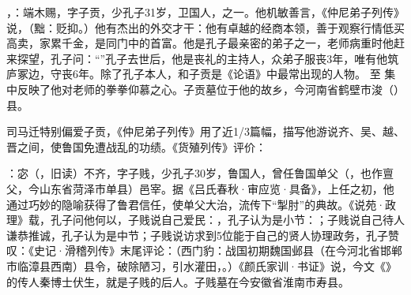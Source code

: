 ，：端木赐，字子贡，少孔子31岁，卫国人，之一。他机敏善言，《仲尼弟子列传》说，（黜：贬抑。）他有杰出的外交才干：他有卓越的经商本领，善于观察行情低买高卖，家累千金，是同门中的首富。他是孔子最亲密的弟子之一，老师病重时他赶来探望，孔子问：“”孔子去世后，他是丧礼的主持人，众弟子服丧3年，唯有他筑庐冢边，守丧6年。除了孔子本人，和子贡是《论语》中最常出现的人物。 至  集中反映了他对老师的拳拳仰慕之心。子贡墓位于他的故乡，今河南省鹤壁市浚（）县。

司马迁特别偏爱子贡，《仲尼弟子列传》用了近1/3篇幅，描写他游说齐、吴、越、晋之间，使鲁国免遭战乱的功绩。《货殖列传》评价：

：宓（，旧读）不齐，字子贱，少孔子30岁，鲁国人，曾任鲁国单父（，也作亶父，今山东省菏泽市单县）邑宰。据《吕氏春秋·审应览·具备》，上任之初，他通过巧妙的隐喻获得了鲁君信任，使单父大治，流传下“掣肘”的典故。《说苑·政理》载，孔子问他何以，子贱说自己爱民：，孔子认为是小节：；子贱说自己待人谦恭推诚，孔子认为是中节；子贱说访求到5位能于自己的贤人协理政务，孔子赞叹：《史记·滑稽列传》末尾评论：（西门豹：战国初期魏国邺县（在今河北省邯郸市临漳县西南）县令，破除陋习，引水灌田，。）《颜氏家训·书证》说，今文《》的传人秦博士伏生，就是子贱的后人。子贱墓在今安徽省淮南市寿县。%

